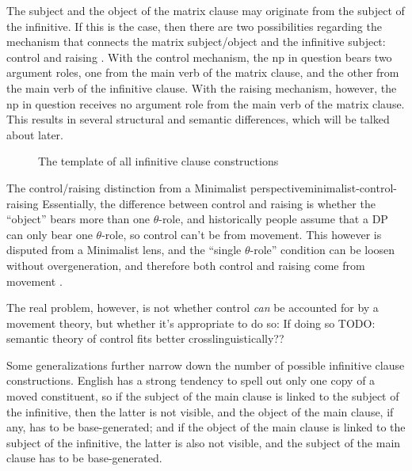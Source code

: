 \documentclass[UTF8, a4paper, oneside, scheme=plain]{ctexrep}
\newcommand*{\citepages}[1]{pp.~{#1}}
\begin{document}
The subject and the object of the matrix clause may originate from the subject of the infinitive.
If this is the case,
then there are two possibilities regarding the mechanism that connects the matrix subject/object 
and the infinitive subject:
control and raising \citet[\citepages{1194-1197}]{cgel}.
With the control mechanism,
the \acs{np} in question bears two argument roles,
one from the main verb of the matrix clause, and the other from the main verb of the infinitive clause.
With the raising mechanism, however,
the \acs{np} in question receives no argument role from the main verb of the matrix clause.
This results in several structural and semantic differences,
which will be talked about later.

\begin{figure}
    \centering
    
    \caption{The template of all infinitive clause constructions}
    \label{fig:complement.infinitive.template}
\end{figure}

\begin{theorybox}{The control/raising distinction from a Minimalist perspective}{minimalist-control-raising}
    Essentially, the difference between control and raising is 
    whether the ``object'' bears more than one $\theta$-role,
    and historically people assume that a DP can only bear one $\theta$-role,
    so control can't be from movement.
    This however is disputed from a Minimalist lens,
    and the ``single $\theta$-role'' condition 
    can be loosen without overgeneration,
    and therefore both control and raising come from movement
    \citet{hornstein1999movement}. 

    The real problem, however, is not whether control \emph{can} be accounted for 
    by a movement theory, 
    but whether it's appropriate to do so:
    If doing so TODO: semantic theory of control fits better crosslinguistically??
\end{theorybox}

Some generalizations further narrow down 
the number of possible infinitive clause constructions.
English has a strong tendency to spell out only one copy of a moved constituent,
so if the subject of the main clause is linked to the subject of the infinitive,
then the latter is not visible,
and the object of the main clause, if any, has to be base-generated;
and if the object of the main clause is linked to the subject of the infinitive,
the latter is also not visible,
and the subject of the main clause has to be base-generated.
\end{document}
